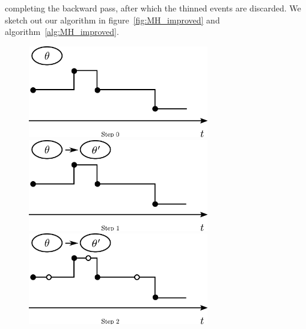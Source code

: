    completing the backward pass, after which the thinned events are
   discarded. We sketch out our algorithm in 
   figure~\ref{fig:MH_improved} and algorithm~\ref{alg:MH_improved}.
\setlength{\unitlength}{0.8cm}
  \begin{figure}[H]
  \centering
  \begin{minipage}[!hp]{0.45\linewidth}
  \centering
    \includegraphics [width=0.70\textwidth, angle=0]{figs/plot0.pdf}
      \end{minipage}
  \begin{minipage}[hp]{0.45\linewidth}
  \centering
    \includegraphics [width=0.70\textwidth, angle=0]{figs/plot1.pdf}
    \vspace{-0 in}
  \end{minipage}
  \begin{minipage}[hp]{0.45\linewidth}
  \centering
    \includegraphics [width=0.70\textwidth, angle=0]{figs/plot2.pdf}
    \vspace{-0 in}
  \end{minipage}
  \begin{minipage}[hp]{0.45\linewidth}
  \centering

\end{minipage}
\end{figure}

